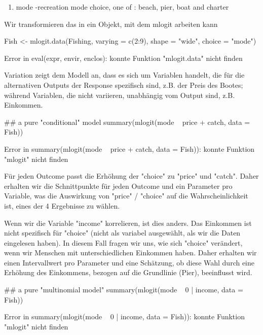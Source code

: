 \documentclass[a4paper,twoside]{tufte-book}\usepackage[]{graphicx}\usepackage[]{color}
\begin{document}
\begin{appendices}
\begin{enumerate}
\item mode -recreation mode choice, one of : beach, pier, boat and charter

\end{enumerate}

Wir transformieren das in ein Objekt, mit dem mlogit arbeiten kann

\begin{Schunk}
\begin{Sinput}
Fish <- mlogit.data(Fishing, varying = c(2:9), shape = "wide", choice = "mode")
\end{Sinput}
\begin{Soutput}
Error in eval(expr, envir, enclos): konnte Funktion "mlogit.data" nicht finden
\end{Soutput}
\end{Schunk}

Variation zeigt dem Modell an, dass es sich um Variablen handelt, die für die alternativen Outputs der Response spezifisch sind, z.B. der Preis des Bootes; während Variablen, die nicht variieren, unabhängig vom Output sind, z.B. Einkommen.

\begin{Schunk}
\begin{Sinput}
## a pure "conditional" model
summary(mlogit(mode ~ price + catch, data = Fish))
\end{Sinput}
\begin{Soutput}
Error in summary(mlogit(mode ~ price + catch, data = Fish)): konnte Funktion "mlogit" nicht finden
\end{Soutput}
\end{Schunk}

Für jeden Outcome passt die Erhöhung der "choice" zu "price" und "catch". Daher erhalten wir die Schnittpunkte für jeden Outcome und ein Parameter pro Variable, was die Auswirkung von "price" / "choice" auf die Wahrscheinlichkeit ist, eines der 4 Ergebnisse zu wählen.

Wenn wir die Variable "income" korrelieren, ist dies anders. Das Einkommen ist nicht spezifisch für "choice" (nicht als variabel ausgewählt, als wir die Daten eingelesen haben). In diesem Fall fragen wir uns, wie sich "choice" verändert, wenn wir Menschen mit unterschiedlichen Einkommen haben. Daher erhalten wir einen Intervallwert pro Parameter und eine Schätzung, ob diese Wahl durch eine Erhöhung des Einkommens, bezogen auf die Grundlinie (Pier), beeinflusst wird.

\begin{Schunk}
\begin{Sinput}
## a pure "multinomial model"
summary(mlogit(mode ~ 0 | income, data = Fish))
\end{Sinput}
\begin{Soutput}
Error in summary(mlogit(mode ~ 0 | income, data = Fish)): konnte Funktion "mlogit" nicht finden
\end{Soutput}
\end{Schunk}


\end{appendices}
\end{document}
